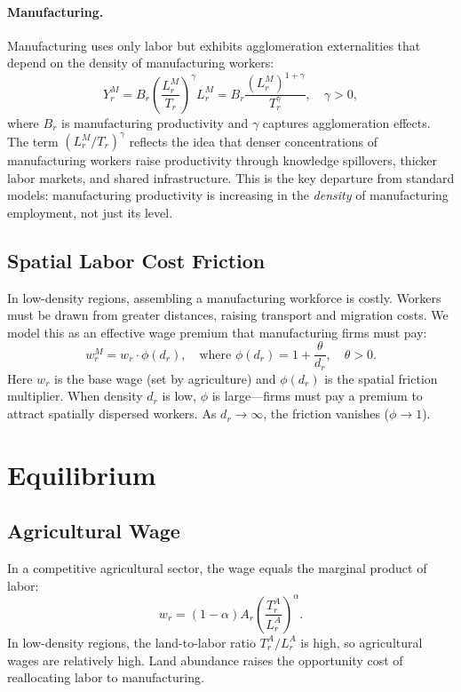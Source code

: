 \documentclass[12pt]{article}
\begin{document}
\paragraph{Manufacturing.} Manufacturing uses only labor but exhibits agglomeration externalities that depend on the density of manufacturing workers:
\[
    Y_r^M = B_r \left(\frac{L_r^M}{T_r}\right)^\gamma L_r^M = B_r \frac{\left(L_r^M\right)^{1+\gamma}}{T_r^\gamma}, \quad \gamma > 0,
\]
where $B_r$ is manufacturing productivity and $\gamma$ captures agglomeration effects. The term $(L_r^M / T_r)^\gamma$ reflects the idea that denser concentrations of manufacturing workers raise productivity through knowledge spillovers, thicker labor markets, and shared infrastructure. This is the key departure from standard models: manufacturing productivity is increasing in the \emph{density} of manufacturing employment, not just its level.

\subsection{Spatial Labor Cost Friction}

In low-density regions, assembling a manufacturing workforce is costly. Workers must be drawn from greater distances, raising transport and migration costs. We model this as an effective wage premium that manufacturing firms must pay:
\[
    w_r^M = w_r \cdot \phi(d_r), \quad \text{where } \phi(d_r) = 1 + \frac{\theta}{d_r}, \quad \theta > 0.
\]
Here $w_r$ is the base wage (set by agriculture) and $\phi(d_r)$ is the spatial friction multiplier. When density $d_r$ is low, $\phi$ is large---firms must pay a premium to attract spatially dispersed workers. As $d_r \to \infty$, the friction vanishes ($\phi \to 1$).

\section{Equilibrium}

\subsection{Agricultural Wage}

In a competitive agricultural sector, the wage equals the marginal product of labor:
\[
    w_r = (1 - \alpha) A_r \left(\frac{T_r^A}{L_r^A}\right)^\alpha.
\]
In low-density regions, the land-to-labor ratio $T_r^A / L_r^A$ is high, so agricultural wages are relatively high. Land abundance raises the opportunity cost of reallocating labor to manufacturing.
\end{document}

